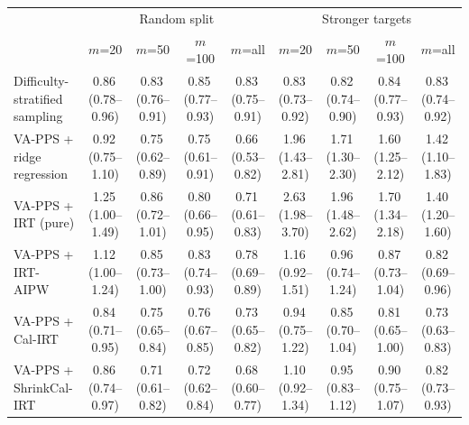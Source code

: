 \begin{tabular}{lcccccccc}
\toprule
 & \multicolumn{4}{c}{Random split} & \multicolumn{4}{c}{Stronger targets} \\
 & $m$=20 & $m$=50 & $m$=100 & $m$=all & $m$=20 & $m$=50 & $m$=100 & $m$=all \\
\midrule
Difficulty-stratified sampling & 0.86\,\scriptsize(0.78--0.96) & 0.83\,\scriptsize(0.76--0.91) & 0.85\,\scriptsize(0.77--0.93) & 0.83\,\scriptsize(0.75--0.91) & 0.83\,\scriptsize(0.73--0.92) & 0.82\,\scriptsize(0.74--0.90) & 0.84\,\scriptsize(0.77--0.93) & 0.83\,\scriptsize(0.74--0.92) \\
VA-PPS + ridge regression & 0.92\,\scriptsize(0.75--1.10) & 0.75\,\scriptsize(0.62--0.89) & 0.75\,\scriptsize(0.61--0.91) & 0.66\,\scriptsize(0.53--0.82) & 1.96\,\scriptsize(1.43--2.81) & 1.71\,\scriptsize(1.30--2.30) & 1.60\,\scriptsize(1.25--2.12) & 1.42\,\scriptsize(1.10--1.83) \\
VA-PPS + IRT (pure) & 1.25\,\scriptsize(1.00--1.49) & 0.86\,\scriptsize(0.72--1.01) & 0.80\,\scriptsize(0.66--0.95) & 0.71\,\scriptsize(0.61--0.83) & 2.63\,\scriptsize(1.98--3.70) & 1.96\,\scriptsize(1.48--2.62) & 1.70\,\scriptsize(1.34--2.18) & 1.40\,\scriptsize(1.20--1.60) \\
VA-PPS + IRT-AIPW & 1.12\,\scriptsize(1.00--1.24) & 0.85\,\scriptsize(0.73--1.00) & 0.83\,\scriptsize(0.74--0.93) & 0.78\,\scriptsize(0.69--0.89) & 1.16\,\scriptsize(0.92--1.51) & 0.96\,\scriptsize(0.74--1.24) & 0.87\,\scriptsize(0.73--1.04) & 0.82\,\scriptsize(0.69--0.96) \\
VA-PPS + Cal-IRT & 0.84\,\scriptsize(0.71--0.95) & 0.75\,\scriptsize(0.65--0.84) & 0.76\,\scriptsize(0.67--0.85) & 0.73\,\scriptsize(0.65--0.82) & 0.94\,\scriptsize(0.75--1.22) & 0.85\,\scriptsize(0.70--1.04) & 0.81\,\scriptsize(0.65--1.00) & 0.73\,\scriptsize(0.63--0.83) \\
VA-PPS + ShrinkCal-IRT & 0.86\,\scriptsize(0.74--0.97) & 0.71\,\scriptsize(0.61--0.82) & 0.72\,\scriptsize(0.62--0.84) & 0.68\,\scriptsize(0.60--0.77) & 1.10\,\scriptsize(0.92--1.34) & 0.95\,\scriptsize(0.83--1.12) & 0.90\,\scriptsize(0.75--1.07) & 0.82\,\scriptsize(0.73--0.93) \\
\bottomrule
\end{tabular}
